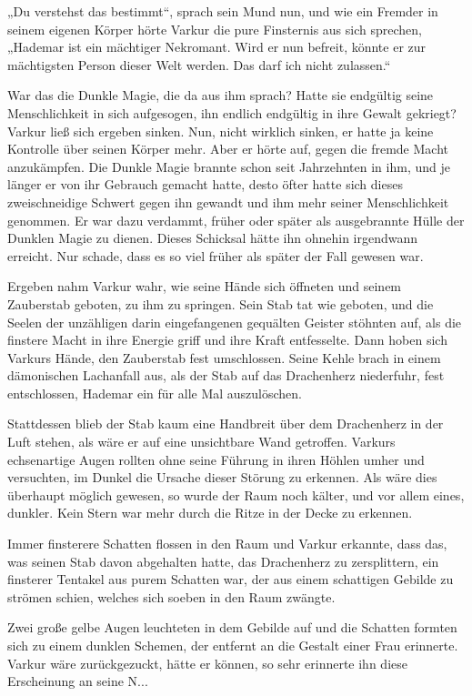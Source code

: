 \documentclass[10pt, a4paper, oneside]{book}
\begin{document}
„Du verstehst das bestimmt“, sprach sein Mund nun, und wie ein Fremder in seinem eigenen Körper hörte Varkur die pure Finsternis aus sich sprechen, „Hademar ist ein mächtiger Nekromant. Wird er nun befreit, könnte er zur mächtigsten Person dieser Welt werden. Das darf ich nicht zulassen.“

War das die Dunkle Magie, die da aus ihm sprach? Hatte sie endgültig seine Menschlichkeit in sich aufgesogen, ihn endlich endgültig in ihre Gewalt gekriegt? Varkur ließ sich ergeben sinken. Nun, nicht wirklich sinken, er hatte ja keine Kontrolle über seinen Körper mehr. Aber er hörte auf, gegen die fremde Macht anzukämpfen. Die Dunkle Magie brannte schon seit Jahrzehnten in ihm, und je länger er von ihr Gebrauch gemacht hatte, desto öfter hatte sich dieses zweischneidige Schwert gegen ihn gewandt und ihm mehr seiner Menschlichkeit genommen. Er war dazu verdammt, früher oder später als ausgebrannte Hülle der Dunklen Magie zu dienen. Dieses Schicksal hätte ihn ohnehin irgendwann erreicht. Nur schade, dass es so viel früher als später der Fall gewesen war.

Ergeben nahm Varkur wahr, wie seine Hände sich öffneten und seinem Zauberstab geboten, zu ihm zu springen. Sein Stab tat wie geboten, und die Seelen der unzähligen darin eingefangenen gequälten Geister stöhnten auf, als die finstere Macht in ihre Energie griff und ihre Kraft entfesselte. Dann hoben sich Varkurs Hände, den Zauberstab fest umschlossen. Seine Kehle brach in einem dämonischen Lachanfall aus, als der Stab auf das Drachenherz niederfuhr, fest entschlossen, Hademar ein für alle Mal auszulöschen.

Stattdessen blieb der Stab kaum eine Handbreit über dem Drachenherz in der Luft stehen, als wäre er auf eine unsichtbare Wand getroffen. Varkurs echsenartige Augen rollten ohne seine Führung in ihren Höhlen umher und versuchten, im Dunkel die Ursache dieser Störung zu erkennen. Als wäre dies überhaupt möglich gewesen, so wurde der Raum noch kälter, und vor allem eines, dunkler. Kein Stern war mehr durch die Ritze in der Decke zu erkennen.

Immer finsterere Schatten flossen in den Raum und Varkur erkannte, dass das, was seinen Stab davon abgehalten hatte, das Drachenherz zu zersplittern, ein finsterer Tentakel aus purem Schatten war, der aus einem schattigen Gebilde zu strömen schien, welches sich soeben in den Raum zwängte.

Zwei große gelbe Augen leuchteten in dem Gebilde auf und die Schatten formten sich zu einem dunklen Schemen, der entfernt an die Gestalt einer Frau erinnerte. Varkur wäre zurückgezuckt, hätte er können, so sehr erinnerte ihn diese Erscheinung an seine N...
\end{document}
